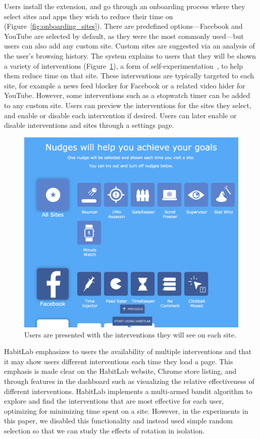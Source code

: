 Users install the extension, and go through an onboarding process where they select sites and apps they wish to reduce their time on (Figure~\ref{fig:onboarding_sites}). There are predefined options---Facebook and YouTube are selected by default, as they were the most commonly used---but users can also add any custom site. Custom sites are suggested via an analysis of the user's browsing history. The system explains to users that they will be shown a variety of interventions (Figure~\ref{fig:onboarding_nudges}), a form of self-experimentation~\cite{Karkar:2017:TFS:3025453.3025480}, to help them reduce time on that site. These interventions are typically targeted to each site, for example a news feed blocker for Facebook or a related video hider for YouTube. However, some interventions such as a stopwatch timer can be added to any custom site. Users can preview the interventions for the sites they select, and enable or disable each intervention if desired. Users can later enable or disable interventions and sites through a settings page.

\begin{figure}
\includegraphics[width=\linewidth]{figures/onboarding_nudges_short}
\caption{Users are presented with the interventions they will see on each site.}
  \label{fig:onboarding_nudges}
\end{figure}

HabitLab emphasizes to users the availability of multiple interventions and that it may show users different interventions each time they load a page. This emphasis is made clear on the HabitLab website, Chrome store listing, and through features in the dashboard such as visualizing the relative effectiveness of different interventions. HabitLab implements a multi-armed bandit algorithm to explore and find the interventions that are most effective for each user, optimizing for minimizing time spent on a site. However, in the experiments in this paper, we disabled this functionality and instead used simple random selection so that we can study the effects of rotation in isolation.


